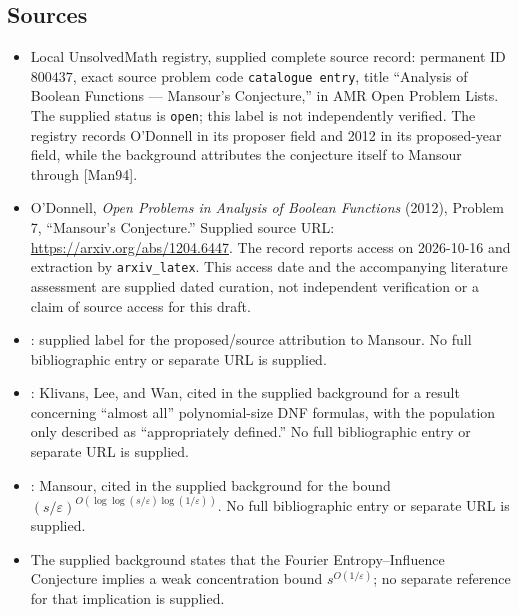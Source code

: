 \documentclass[11pt]{article}
\begin{document}
\subsection{Sources}
\begin{itemize}
\item Local UnsolvedMath registry, supplied complete source record: permanent ID \(800437\), exact source problem code \texttt{catalogue entry}, title ``Analysis of Boolean Functions --- Mansour's Conjecture,'' in AMR Open Problem Lists. The supplied status is \texttt{open}; this label is not independently verified. The registry records O'Donnell in its proposer field and 2012 in its proposed-year field, while the background attributes the conjecture itself to Mansour through [Man94].
\item O'Donnell, \emph{Open Problems in Analysis of Boolean Functions} (2012), Problem 7, ``Mansour's Conjecture.'' Supplied source URL: \url{https://arxiv.org/abs/1204.6447}. The record reports access on 2026-10-16 and extraction by \texttt{arxiv\_latex}. This access date and the accompanying literature assessment are supplied dated curation, not independent verification or a claim of source access for this draft.
\item [Man94]: supplied label for the proposed/source attribution to Mansour. No full bibliographic entry or separate URL is supplied.
\item [KLW10]: Klivans, Lee, and Wan, cited in the supplied background for a result concerning ``almost all'' polynomial-size DNF formulas, with the population only described as ``appropriately defined.'' No full bibliographic entry or separate URL is supplied.
\item [Man95]: Mansour, cited in the supplied background for the bound \((s/\varepsilon)^{O(\log\log(s/\varepsilon)\log(1/\varepsilon))}\). No full bibliographic entry or separate URL is supplied.
\item The supplied background states that the Fourier Entropy--Influence Conjecture implies a weak concentration bound \(s^{O(1/\varepsilon)}\); no separate reference for that implication is supplied.
\end{itemize}
\end{document}
